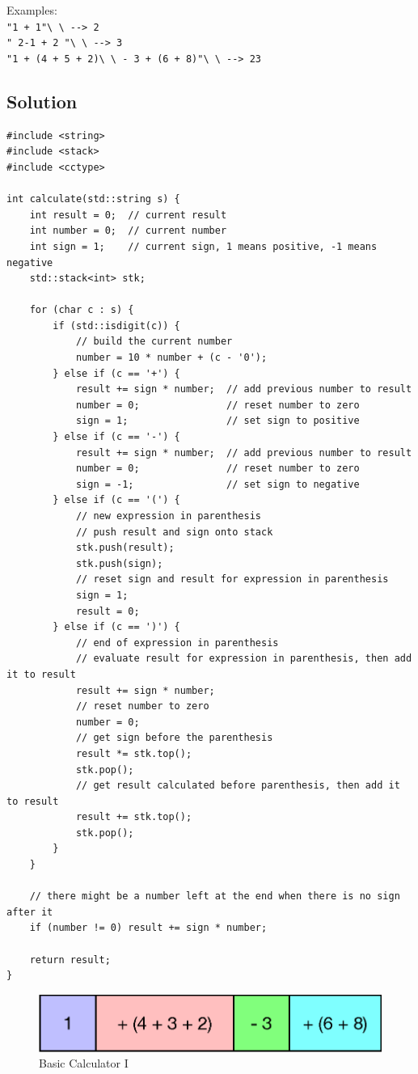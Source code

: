 Examples:\\
{\colorbox{CodeBackground}{\lstinline|"1 + 1"\ \ --> 2|}}\\
{\colorbox{CodeBackground}{\lstinline|" 2-1 + 2 "\ \ --> 3|}} \\
{\colorbox{CodeBackground}{\lstinline|"1 + (4 + 5 + 2)\ \ - 3 + (6 + 8)"\ \ --> 23|}}

\subsection*{Solution}
\begin{lstlisting}
#include <string>
#include <stack>
#include <cctype>

int calculate(std::string s) {
	int result = 0;  // current result
	int number = 0;  // current number
	int sign = 1;    // current sign, 1 means positive, -1 means negative
	std::stack<int> stk;
	
	for (char c : s) {
		if (std::isdigit(c)) {
			// build the current number
			number = 10 * number + (c - '0');
		} else if (c == '+') {
			result += sign * number;  // add previous number to result
			number = 0;               // reset number to zero
			sign = 1;                 // set sign to positive
		} else if (c == '-') {
			result += sign * number;  // add previous number to result
			number = 0;               // reset number to zero
			sign = -1;                // set sign to negative
		} else if (c == '(') {
			// new expression in parenthesis
			// push result and sign onto stack
			stk.push(result);
			stk.push(sign);
			// reset sign and result for expression in parenthesis
			sign = 1;
			result = 0;
		} else if (c == ')') {
			// end of expression in parenthesis
			// evaluate result for expression in parenthesis, then add it to result
			result += sign * number;
			// reset number to zero
			number = 0;
			// get sign before the parenthesis
			result *= stk.top();
			stk.pop();
			// get result calculated before parenthesis, then add it to result
			result += stk.top();
			stk.pop();
		}
	}
	
	// there might be a number left at the end when there is no sign after it
	if (number != 0) result += sign * number;
	
	return result;
}
\end{lstlisting}

\begin{figure}[H]
	\centering
	\includegraphics[width=0.35\linewidth]{images/basic_calculator_1}
	\caption{Basic Calculator I}
	\label{fig:basiccalculator1}
\end{figure}

